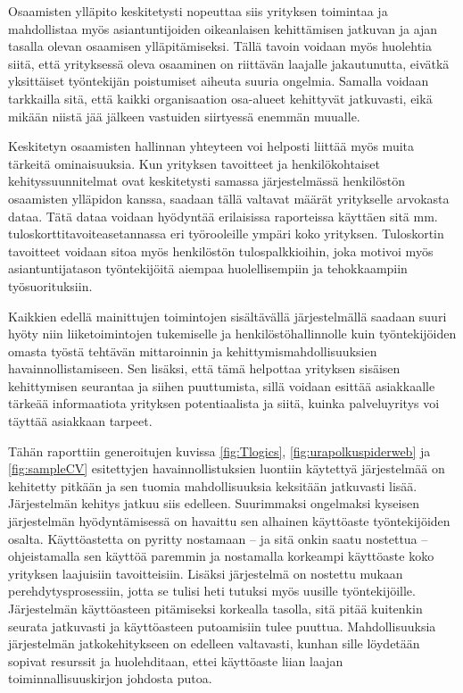 \documentclass[a4paper,finnish,12pt]{article}
\begin{document}
Osaamisten ylläpito keskitetysti nopeuttaa siis yrityksen toimintaa ja mahdollistaa myös asiantuntijoiden oikeanlaisen kehittämisen jatkuvan ja ajan tasalla olevan osaamisen ylläpitämiseksi. Tällä tavoin voidaan myös huolehtia siitä, että yrityksessä oleva osaaminen on riittävän laajalle jakautunutta, eivätkä yksittäiset työntekijän poistumiset aiheuta suuria ongelmia. Samalla voidaan tarkkailla sitä, että kaikki organisaation osa-alueet kehittyvät jatkuvasti, eikä mikään niistä jää jälkeen vastuiden siirtyessä enemmän muualle.

Keskitetyn osaamisten hallinnan yhteyteen voi helposti liittää myös muita tärkeitä ominaisuuksia. Kun yrityksen tavoitteet ja henkilökohtaiset kehityssuunnitelmat ovat keskitetysti samassa järjestelmässä henkilöstön osaamisten ylläpidon kanssa, saadaan tällä valtavat määrät yritykselle arvokasta dataa. Tätä dataa voidaan hyödyntää erilaisissa raporteissa käyttäen sitä mm. tuloskorttitavoiteasetannassa eri työrooleille ympäri koko yrityksen. Tuloskortin tavoitteet voidaan sitoa myös henkilöstön tulospalkkioihin, joka motivoi myös asiantuntijatason työntekijöitä aiempaa huolellisempiin ja tehokkaampiin työsuorituksiin.

Kaikkien edellä mainittujen toimintojen sisältävällä järjestelmällä saadaan suuri hyöty niin liiketoimintojen tukemiselle ja henkilöstöhallinnolle kuin työntekijöiden omasta työstä tehtävän mittaroinnin ja kehittymismahdollisuuksien havainnollistamiseen. Sen lisäksi, että tämä helpottaa yrityksen sisäisen kehittymisen seurantaa ja siihen puuttumista, sillä voidaan esittää asiakkaalle tärkeää informaatiota yrityksen potentiaalista ja siitä, kuinka palveluyritys voi täyttää asiakkaan tarpeet.

Tähän raporttiin generoitujen kuvissa \ref{fig:Tlogics}, \ref{fig:urapolkuspiderweb} ja \ref{fig:sampleCV} esitettyjen havainnollistuksien luontiin käytettyä järjestelmää on kehitetty pitkään ja sen tuomia mahdollisuuksia keksitään jatkuvasti lisää. Järjestelmän kehitys jatkuu siis edelleen. Suurimmaksi ongelmaksi kyseisen järjestelmän hyödyntämisessä on havaittu sen alhainen käyttöaste työntekijöiden osalta. Käyttöastetta on pyritty nostamaan -- ja sitä onkin saatu nostettua -- ohjeistamalla sen käyttöä paremmin ja nostamalla korkeampi käyttöaste koko yrityksen laajuisiin tavoitteisiin. Lisäksi järjestelmä on nostettu mukaan perehdytysprosessiin, jotta se tulisi heti tutuksi myös uusille työntekijöille. Järjestelmän käyttöasteen pitämiseksi korkealla tasolla, sitä pitää kuitenkin seurata jatkuvasti ja käyttöasteen putoamisiin tulee puuttua. Mahdollisuuksia järjestelmän jatkokehitykseen on edelleen valtavasti, kunhan sille löydetään sopivat resurssit ja huolehditaan, ettei käyttöaste liian laajan toiminnallisuuskirjon johdosta putoa.

\clearpage



\appendix
\end{document}

